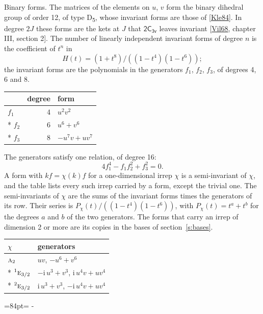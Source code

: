 \documentclass[10pt,a4paper]{article}
\makeatletter
\renewcommand\paragraph{\@startsection{paragraph}{4}{\z@}{1.5ex plus .5ex minus .2ex}{-1em}%
  {\normalfont\small\sffamily\bfseries\color{parttitle}}}
\newcommand{\needspace}[1]{\par\penalty-100\begingroup\dimen0=#1\relax\dimen2=\pagegoal
  \advance\dimen2-\pagetotal\ifdim\dimen0>\dimen2\relax\ifdim\dimen2>0pt\vfil\break\fi\fi
  \endgroup}
\numberwithin{equation}{section}
\newcommand{\grp}[1]{\mathsf{#1}}
\newcommand{\irr}[1]{\text{\normalfont\scshape #1}}
\newcommand{\conjpair}[1]{{}^{#1}}
\newcommand{\iunit}{\mathrm{i}}
\makeatother
\begin{document}
\paragraph{Binary forms.}
The matrices of the elements on $u$, $v$ form the binary dihedral group of order 12, of type D\textsubscript{5}, whose invariant forms are those of [\href{../../../REFERENCES.pdf\#ref.Kle84}{Kle84}]. In degree $2J$ these forms are the kets at $J$ that $\grp{2C_{3v}}$ leaves invariant [\href{../../../REFERENCES.pdf\#ref.Vil68}{Vil68}, chapter III, section 2]. \label{n:head.degree}\label{n:head.form}The number of linearly independent invariant forms of degree $n$ is the coefficient of $t^n$ in
\begin{equation}\label{e:molien}H(t) = (1 + t^{8})/((1-t^{4})(1-t^{6}));\end{equation}
the invariant forms are the polynomials in the generators $f_1$, $f_2$, $f_3$, of degrees 4, 6 and 8.
{\small\begin{longtable}{@{}lrl@{}}\toprule
& degree & form\\\midrule\endhead
\bottomrule\endfoot\endlastfoot
$f_{1}$ & 4 & $u^{2}v^{2}$\\*
$f_{2}$ & 6 & $u^{6} + v^{6}$\\*
$f_{3}$ & 8 & $-u^{7}v + uv^{7}$\\
\bottomrule\end{longtable}}
The generators satisfy one relation, of degree 16:
\begin{equation}\label{e:relation}4f_{1}^{4} - f_{1}f_{2}^{2} + f_{3}^{2} = 0.\end{equation}
A form with $k f = \chi(k) f$ for a one-dimensional irrep $\chi$ is a semi-invariant of $\chi$, and the table lists every such irrep carried by a form, except the trivial one. \label{n:head.generators}The semi-invariants of $\chi$ are the sums of the invariant forms times the generators of its row. Their series is $P_\chi(t)/((1-t^{4})(1-t^{6}))$, with $P_\chi(t) = t^{a} + t^{b}$ for the degrees $a$ and $b$ of the two generators. The forms that carry an irrep of dimension 2 or more are its copies in the bases of section~\ref{s:bases}.
{\small\begin{longtable}{@{}ll@{}}\toprule
$\chi$ & generators\\\midrule\endhead
\bottomrule\endfoot\endlastfoot
$\irr{a}_{2}$ & $uv$, $-u^{6} + v^{6}$\\*
$\conjpair{1}\irr{e}_{3/2}$ & $-\iunit{}\,u^{3} + v^{3}$, $\iunit{}\,u^{4}v + uv^{4}$\\*
$\conjpair{2}\irr{e}_{3/2}$ & $\iunit{}\,u^{3} + v^{3}$, $-\iunit{}\,u^{4}v + uv^{4}$\\
\bottomrule\end{longtable}}
\needspace{84pt}
\end{document}
